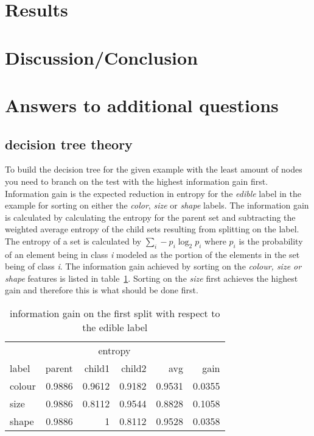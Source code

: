 \documentclass[11pt]{article}
\begin{document}
\section{Results}

\section{Discussion/Conclusion}



\section{Answers to additional questions}

\subsection{decision tree theory}

To build the decision tree for the given example with the least amount of nodes you need to branch on the test with the highest information gain first. Information gain is the expected reduction in entropy for the \emph{edible} label in the example for sorting on either the \emph{color}, \emph{size} or \emph{shape} labels. The information gain is calculated by calculating the entropy for the parent set and subtracting the weighted average entropy of the child sets resulting from splitting on the label. The entropy of a set is calculated by $\sum\limits_i - p_i \log_2 p_i $ where $p_i$ is the probability of an element being in class \emph{i} modeled as the portion of the elements in the set being of class \emph{i}. The information gain achieved by sorting on the \emph{colour, size or shape} features is listed in table~\ref{tab:gain}. Sorting on the \emph{size} first achieves the highest gain and therefore this is what should be done first.

\begin{table}[h]\footnotesize
\label{tab:gain}
\begin{tabular}{ l r r r r r }
& \multicolumn{4}{c}{entropy} & \\
\cline{2-5}
label & parent & child1 & child2 & avg & gain \\
\hline
colour & 0.9886 & 0.9612 & 0.9182 & 0.9531 & 0.0355 \\
size & 0.9886 & 0.8112 & 0.9544 & 0.8828 & 0.1058 \\
shape & 0.9886 & 1 & 0.8112 & 0.9528 & 0.0358 \\
\end{tabular}
\caption{information gain on the first split with respect to the edible label}
\end{table}
\end{document}
